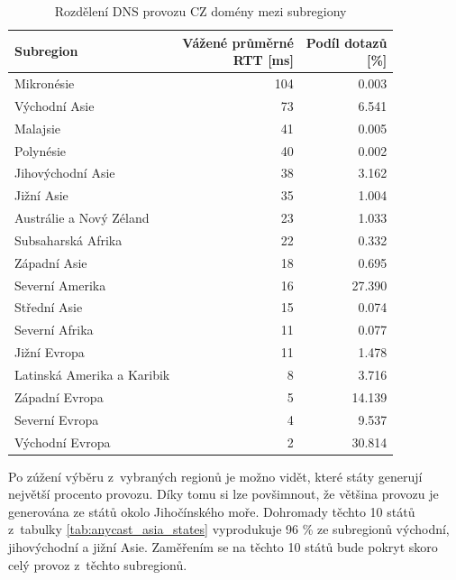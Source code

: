 \documentclass[thesis=M,czech]{src/FITthesis}[2019/12/23]
\begin{document}
\begin{table}
\centering
\begin{tabular}{lrr}
\toprule
{Subregion} & \makecell{Vážené průměrné\\RTT [ms]}  & \makecell{Podíl dotazů\\\ [\%]} \\
\midrule
Mikronésie                      & 104 &   0.003 \\
Východní Asie                    &  73 &   6.541 \\
Malajsie                       &  41 &   0.005 \\
Polynésie                       &  40 &   0.002 \\
Jihovýchodní Asie              &  38 &   3.162 \\
Jižní Asie                   &  35 &   1.004 \\
Austrálie a Nový Zéland       &  23 &   1.033 \\
Subsaharská Afrika              &  22 &   0.332 \\
Západní Asie                    &  18 &   0.695 \\
Severní Amerika                &  16 &  27.390 \\
Střední Asie                    &  15 &   0.074 \\
Severní Afrika                  &  11 &   0.077 \\
Jižní Evropa                    &  11 &   1.478 \\
Latinská Amerika a Karibik      &   8 &   3.716 \\
Západní Evropa                  &   5 &  14.139 \\
Severní Evropa                 &   4 &   9.537 \\
Východní Evropa                  &   2 &  30.814 \\
\bottomrule
\end{tabular}
 	\caption[]{Rozdělení DNS provozu CZ domény mezi subregiony} 
 	\label{tab:anycast_subregion}
\end{table}

Po zúžení výběru z~vybraných regionů je možno vidět, které státy generují největší procento provozu. Díky tomu si lze povšimnout, že většina provozu je generována ze států okolo Jihočínského moře. Dohromady těchto 10 států z~tabulky \ref{tab:anycast_asia_states} vyprodukuje 96 \% ze subregionů východní, jihovýchodní a jižní Asie. Zaměřením se na těchto 10 států bude pokryt skoro celý provoz z~těchto subregionů.   
\end{document}
